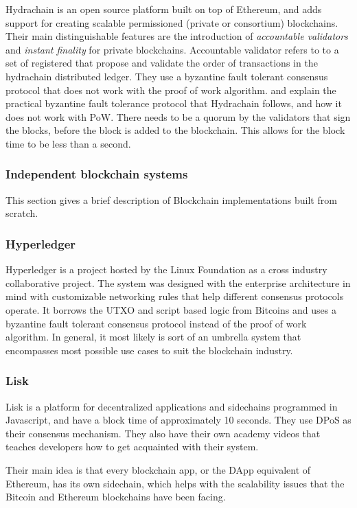 \documentclass[english]{tktltiki}
\begin{document}
Hydrachain \cite{hydrachain} is an open source platform built on top of Ethereum, and adds support for creating scalable permissioned (private or consortium) blockchains. Their main distinguishable features are the introduction of \textit{accountable validators} and \textit{instant finality} for private blockchains. Accountable validator refers to to a set of registered that propose and validate the order of transactions in the hydrachain distributed ledger. They use a byzantine fault tolerant consensus protocol that does not work with the proof of work algorithm. \cite{pbft} and \cite{pbft2} explain the practical byzantine fault tolerance protocol that Hydrachain follows, and how it does not work with PoW. There needs to be a quorum by the validators that sign the blocks, before the block is added to the blockchain. This allows for the block time to be less than a second.

\subsubsection{Independent blockchain systems}
This section gives a brief description of Blockchain implementations built from scratch.

\subsubsection*{Hyperledger}
Hyperledger\cite{hyperledger} is a project hosted by the Linux Foundation as a cross industry collaborative project. The system was designed with the enterprise architecture in mind with customizable networking rules that help different consensus protocols operate. It borrows the UTXO and script based logic from Bitcoins and uses a byzantine fault tolerant consensus protocol instead of the proof of work algorithm. In general, it most likely is sort of an umbrella system that encompasses most possible use cases to suit the blockchain industry. 

\subsubsection*{Lisk}
Lisk \cite{lisk} is a platform for decentralized applications and sidechains programmed in Javascript, and have a block time of approximately 10 seconds. They use DPoS as their consensus mechanism. They also have their own academy videos\cite{liskacademy} that teaches developers how to get acquainted with their system.

Their main idea is that every blockchain app, or the DApp equivalent of Ethereum, has its own sidechain, which helps with the scalability issues that the Bitcoin and Ethereum blockchains have been facing. \newline
\end{document}
